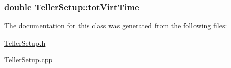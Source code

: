 \subsubsection[{\texorpdfstring{tot\+Virt\+Time}{totVirtTime}}]{\setlength{\rightskip}{0pt plus 5cm}double Teller\+Setup\+::tot\+Virt\+Time\hspace{0.3cm}{\ttfamily [protected]}}\hypertarget{class_teller_setup_adaeb7d70c8f45a5439f302ff8aaa8f88}{}\label{class_teller_setup_adaeb7d70c8f45a5439f302ff8aaa8f88}


The documentation for this class was generated from the following files\+:\begin{DoxyCompactItemize}
\item 
\hyperlink{_teller_setup_8h}{Teller\+Setup.\+h}\item 
\hyperlink{_teller_setup_8cpp}{Teller\+Setup.\+cpp}\end{DoxyCompactItemize}
